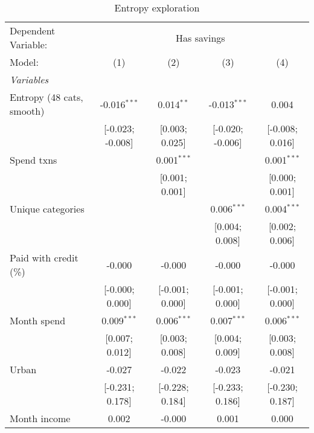 
\begin{table}[htbp]
   \centering
   \tiny
   \begin{threeparttable}[b]
      \caption{\label{tab:reg_has_sa_inflows_explore_smooth} Entropy exploration}
      \begin{tabular}{lcccc}
         \tabularnewline \midrule \midrule
         Dependent Variable: & \multicolumn{4}{c}{Has savings}\\
         Model:                    & (1)              & (2)             & (3)              & (4)\\  
         \midrule
         \emph{Variables}\\
         Entropy (48 cats, smooth) & -0.016$^{***}$   & 0.014$^{**}$    & -0.013$^{***}$   & 0.004\\   
                                   & [-0.023; -0.008] & [0.003; 0.025]  & [-0.020; -0.006] & [-0.008; 0.016]\\   
         Spend txns                &                  & 0.001$^{***}$   &                  & 0.001$^{***}$\\   
                                   &                  & [0.001; 0.001]  &                  & [0.000; 0.001]\\   
         Unique categories         &                  &                 & 0.006$^{***}$    & 0.004$^{***}$\\   
                                   &                  &                 & [0.004; 0.008]   & [0.002; 0.006]\\   
         Paid with credit (\%)     & -0.000           & -0.000          & -0.000           & -0.000\\   
                                   & [-0.000; 0.000]  & [-0.001; 0.000] & [-0.001; 0.000]  & [-0.001; 0.000]\\   
         Month spend               & 0.009$^{***}$    & 0.006$^{***}$   & 0.007$^{***}$    & 0.006$^{***}$\\   
                                   & [0.007; 0.012]   & [0.003; 0.008]  & [0.004; 0.009]   & [0.003; 0.008]\\   
         Urban                     & -0.027           & -0.022          & -0.023           & -0.021\\   
                                   & [-0.231; 0.178]  & [-0.228; 0.184] & [-0.233; 0.186]  & [-0.230; 0.187]\\   
         Month income              & 0.002            & -0.000          & 0.001            & 0.000\\   

\end{tabular}
\end{threeparttable}
\end{table}
